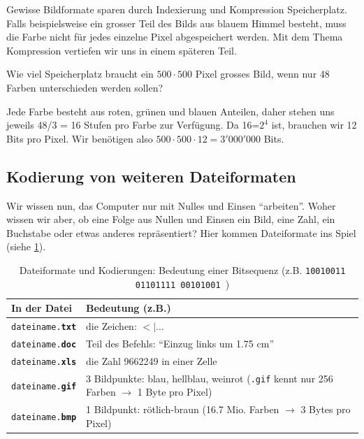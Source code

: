 Gewisse Bildformate sparen durch Indexierung und Kompression Speicherplatz. Falls beispielsweise ein grosser Teil des Bilds aus blauem Himmel besteht, muss die Farbe nicht für jedes einzelne Pixel abgespeichert werden. Mit dem Thema Kompression vertiefen wir uns in einem späteren Teil.

\begin{myexercise}
	Wie viel Speicherplatz braucht ein $500\cdot 500$ Pixel grosses Bild, wenn nur 48 Farben unterschieden werden sollen?
	\begin{myanswer}
		Jede Farbe besteht aus roten, grünen und blauen Anteilen, daher stehen uns jeweils 48/3 = 16 Stufen pro Farbe zur Verfügung. Da 16=$2^4$ ist, brauchen wir 12 Bits pro Pixel. Wir benötigen also $500\cdot 500\cdot 12 = 3'000'000$ Bits.
	\end{myanswer}
\end{myexercise}

\subsection{Kodierung von weiteren Dateiformaten}
Wir wissen nun, das Computer nur mit Nulles und Einsen \enquote{arbeiten}. Woher wissen wir aber, ob eine Folge aus Nullen und Einsen ein Bild, eine Zahl, ein Buchstabe oder etwas anderes repräsentiert? Hier kommen Dateiformate ins Spiel (siehe \cref{table:formats-codes}).

\begin{table}[H]
	\centering
	\begin{tabular}{l|p{11cm}}
		\textbf{In der Datei}           & \textbf{Bedeutung (z.B.)}                                                                                 \\\midrule
		\texttt{dateiname.\textbf{txt}} & die Zeichen: $<|\ldots$                                                                                   \\
		\texttt{dateiname.\textbf{doc}} & Teil des Befehls: \enquote{Einzug links um 1.75 cm}                                                       \\
		\texttt{dateiname.\textbf{xls}} & die Zahl 9662249 in einer Zelle                                                                           \\
		\texttt{dateiname.\textbf{gif}} & 3 Bildpunkte: blau, hellblau, weinrot (\texttt{.gif} kennt nur 256 Farben $\rightarrow$ 1 Byte pro Pixel) \\
		\texttt{dateiname.\textbf{bmp}} & 1 Bildpunkt: rötlich-braun (16.7 Mio. Farben $\rightarrow$ 3 Bytes pro Pixel)
	\end{tabular}
	\caption{Dateiformate und Kodierungen: Bedeutung einer Bitsequenz (z.B. \texttt{10010011   01101111   00101001
		})}
	\label{table:formats-codes}
\end{table}

